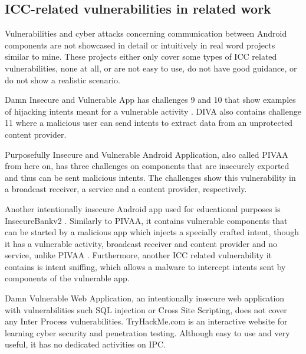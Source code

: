 		\subsection{ICC-related vulnerabilities in related work}
		    \label{subsec:ICC_related_work}
		
		Vulnerabilities and cyber attacks concerning communication between Android components are not showcased in detail or intuitively in real word projects similar to mine. These projects either only cover some types of ICC related vulnerabilities, none at all, or are not easy to use, do not have good guidance, or do not show a realistic scenario.
		
		Damn Insecure and Vulnerable App has challenges 9 and 10 that show examples of hijacking intents meant for a vulnerable activity \cite{diva_walkthrough}. DIVA also contains challenge 11 where a malicious user can send intents to extract data from an unprotected content provider. 
		
		Purposefully Insecure and Vulnerable Android Application, also called PIVAA from here on, has three challenges on components that are insecurely exported and thus can be sent malicious intents. The challenges show this vulnerability in a broadcast receiver, a service and a content provider, respectively.
		
		Another intentionally insecure Android app used for educational purposes is InsecureBankv2 \cite{android_insecure_bank_github}. Similarly to PIVAA, it contains vulnerable components that can be started by a malicious app which injects a specially crafted intent, though it has a vulnerable activity, broadcast receiver and content provider and no service, unlike PIVAA \cite{android_insecure_bank_walkthrough}. Furthermore, another ICC related vulnerability it contains is intent sniffing, which allows a malware to intercept intents sent by components of the vulnerable app.
		
		Damn Vulnerable Web Application, an intentionally insecure web application with vulnerabilities such SQL injection or Cross Site Scripting, does not cover any Inter Process vulnerabilities. TryHackMe.com is an interactive website for learning cyber security and penetration testing. Although easy to use and very useful, it has no dedicated activities on IPC.
		
